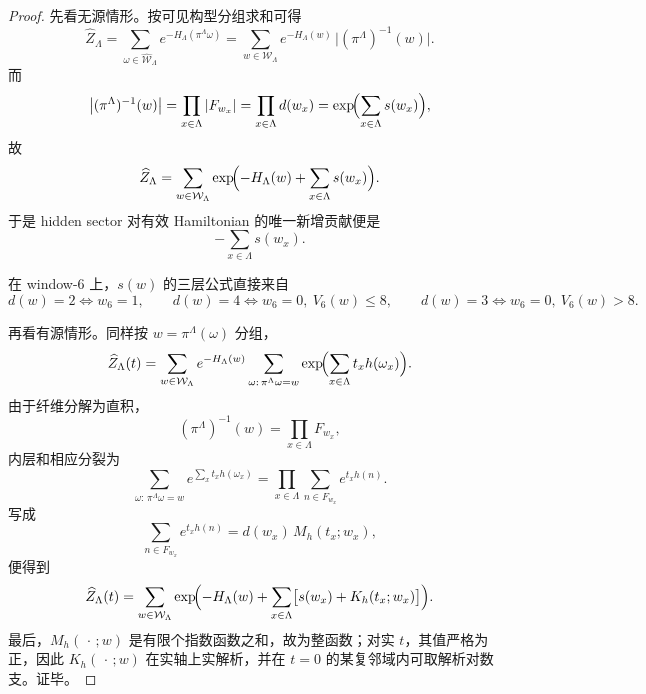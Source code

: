 \begin{proof}
先看无源情形。按可见构型分组求和可得
\[
\widehat Z_\Lambda
=
\sum_{\omega\in\widehat{\mathcal W}_\Lambda}
e^{-H_\Lambda(\pi^\Lambda\omega)}
=
\sum_{w\in\mathcal W_\Lambda}
e^{-H_\Lambda(w)}\,
\bigl|(\pi^\Lambda)^{-1}(w)\bigr|.
\]
而
\[
\bigl|(\pi^\Lambda)^{-1}(w)\bigr|
=
\prod_{x\in\Lambda}|F_{w_x}|
=
\prod_{x\in\Lambda}d(w_x)
=
\exp\!\Bigl(\sum_{x\in\Lambda}s(w_x)\Bigr),
\]
故
\[
\widehat Z_\Lambda
=
\sum_{w\in\mathcal W_\Lambda}
\exp\!\Bigl(
-H_\Lambda(w)+\sum_{x\in\Lambda}s(w_x)
\Bigr).
\]
于是 hidden sector 对有效 Hamiltonian 的唯一新增贡献便是
\[
-\sum_{x\in\Lambda}s(w_x).
\]

在 window-\(6\) 上，\(s(w)\) 的三层公式直接来自
\[
d(w)=2\iff w_6=1,
\qquad
d(w)=4\iff w_6=0,\ V_6(w)\le 8,
\qquad
d(w)=3\iff w_6=0,\ V_6(w)>8.
\]

再看有源情形。同样按 \(w=\pi^\Lambda(\omega)\) 分组，
\[
\widehat Z_\Lambda(t)
=
\sum_{w\in\mathcal W_\Lambda}
e^{-H_\Lambda(w)}
\sum_{\omega:\,\pi^\Lambda\omega=w}
\exp\!\Bigl(\sum_{x\in\Lambda}t_x h(\omega_x)\Bigr).
\]
由于纤维分解为直积，
\[
(\pi^\Lambda)^{-1}(w)=\prod_{x\in\Lambda}F_{w_x},
\]
内层和相应分裂为
\[
\sum_{\omega:\,\pi^\Lambda\omega=w}
e^{\sum_x t_x h(\omega_x)}
=
\prod_{x\in\Lambda}\sum_{n\in F_{w_x}}e^{t_x h(n)}.
\]
写成
\[
\sum_{n\in F_{w_x}}e^{t_x h(n)}
=
d(w_x)\,M_h(t_x;w_x),
\]
便得到
\[
\widehat Z_\Lambda(t)
=
\sum_{w\in\mathcal W_\Lambda}
\exp\!\Bigl(
-H_\Lambda(w)+\sum_{x\in\Lambda}\bigl[s(w_x)+K_h(t_x;w_x)\bigr]
\Bigr).
\]
最后，\(M_h(\,\cdot\,;w)\) 是有限个指数函数之和，故为整函数；对实 \(t\)，其值严格为正，因此 \(K_h(\,\cdot\,;w)\) 在实轴上实解析，并在 \(t=0\) 的某复邻域内可取解析对数支。证毕。
\end{proof}

